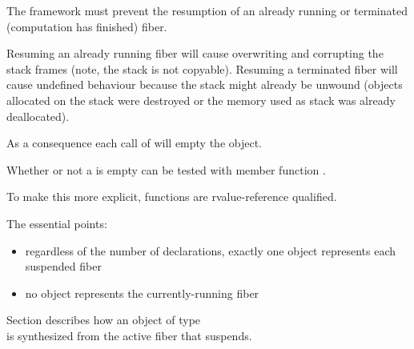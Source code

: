 \label{invalidation}

The framework must prevent the resumption of an already running or terminated
(computation has finished) fiber.

Resuming an already running fiber will cause overwriting and corrupting the stack
frames (note, the stack is not copyable).  Resuming a terminated fiber will
cause undefined behaviour because the stack might already be unwound (objects
allocated on the stack were destroyed or the memory used as stack was already
deallocated).

As a consequence each call of \resume will empty the \fiber object.

Whether or not a \fiber is empty can be tested with member function \opbool.

To make this more explicit, functions \allresume are rvalue-reference qualified.

The essential points:
\begin{itemize}
    \item regardless of the number of \fiber declarations, exactly one \fiber
          object represents each suspended fiber
    \item no \fiber object represents the currently-running fiber
\end{itemize}

Section  describes how an object of type\\
\fiber is synthesized from the active fiber that suspends.

